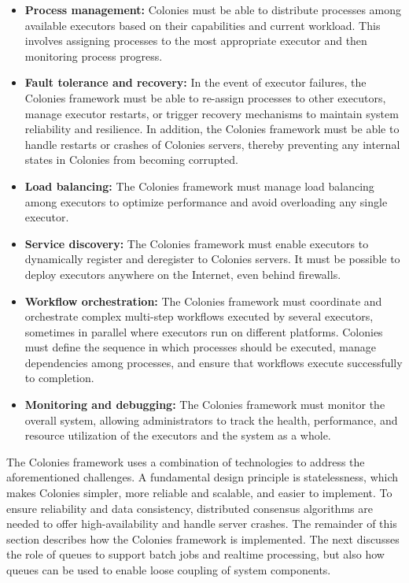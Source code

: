 \documentclass{article}
\begin{document}
\begin{itemize}
\item \textbf{Process management:} Colonies must be able to distribute processes among available executors based on their capabilities and current workload. This involves assigning processes to the most appropriate executor and then monitoring process progress.

\item \textbf{Fault tolerance and recovery:} In the event of executor failures, the Colonies framework must be able to re-assign processes to other executors, manage executor restarts, or trigger recovery mechanisms to maintain system reliability and resilience. In addition, the Colonies framework must be able to handle restarts or crashes of Colonies servers, thereby preventing any internal states in Colonies from becoming corrupted. 

\item \textbf{Load balancing:} The Colonies framework must manage load balancing among executors to optimize performance and avoid overloading any single executor.

\item \textbf{Service discovery:} The Colonies framework must enable executors to dynamically register and deregister to Colonies servers. It must be possible to deploy executors anywhere on the Internet, even behind firewalls.

\item \textbf{Workflow orchestration:} The Colonies framework must coordinate and orchestrate complex multi-step workflows executed by several executors, sometimes in parallel where executors run on different platforms. Colonies must define the sequence in which processes should be executed, manage dependencies among processes, and ensure that workflows execute successfully to completion.

\item \textbf{Monitoring and debugging:} The Colonies framework must monitor the overall system, allowing administrators to track the health, performance, and resource utilization of the executors and the system as a whole.
\end{itemize}

The Colonies framework uses a combination of technologies to address the aforementioned challenges. A fundamental design principle is statelessness, which makes Colonies simpler, more reliable and scalable, and easier to implement. To ensure reliability and data consistency, distributed consensus algorithms are needed to offer high-availability and handle server crashes. The remainder of this section describes how the Colonies framework is implemented. The next discusses the role of queues to support batch jobs and realtime processing, but also how queues can be used to enable loose coupling of system components.
\end{document}
